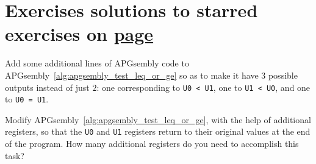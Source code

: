 

\section*{Exercises \hfill \normalfont\textsf{\small solutions to starred exercises on \hyperlink{solutions_universal_computation}{page \pageref{solutions_universal_computation}}}}
\label{sec:solutions_universal_computation}
\vspace*{-0.4cm}\hrulefill\vspace*{-0.3cm}\footnotesize\begin{multicols}{2}\vspace*{-0.4cm}\raggedcolumns{}
	\setlength{\parskip}{0pt}\ifdefined\FORPRINTING{}\else%
\fi
	
	
	\begin{problem}\label{exer:universal_computation_apgsembly_le_ge_eq} 
		Add some additional lines of APGsembly code to APGsembly~\ref{alg:apgsembly_test_leq_or_ge} so as to make it have $3$ possible outputs instead of just $2$: one corresponding to \texttt{U0 < U1}, one to \texttt{U1 < U0}, and one to \texttt{U0 = U1}.
	\end{problem}
	
	
	\mfilbreak
	
	
	\begin{problem}\label{exer:universal_computation_apgsembly_leq_ge_reset} 
		Modify APGsembly~\ref{alg:apgsembly_test_leq_or_ge}, with the help of additional registers, so that the \texttt{U0} and \texttt{U1} registers return to their original values at the end of the program. How many additional registers do you need to accomplish this task?
	\end{problem}
	

\end{multicols}
